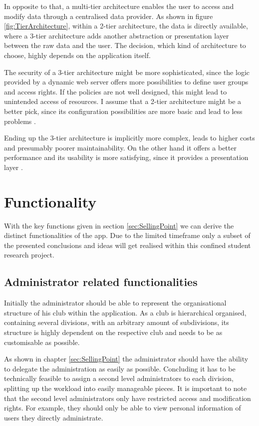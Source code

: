 In opposite to that, a multi-tier architecture enables the user to access and modify data through a centralised data provider. As shown in figure \vref{fig:TierArchitecture}, within a 2-tier architecture, the data is directly available, where a 3-tier architecture adds another abstraction or presentation layer between the raw data and the user. The decision, which kind of architecture to choose, highly depends on the application itself. 

The security of a 3-tier architecture might be more sophisticated, since the logic provided by a dynamic web server offers more possibilities to define user groups and access rights. If the policies are not well designed, this might lead to unintended access of resources. I assume that a 2-tier architecture might be a better pick, since its configuration possibilities are more basic and lead to less problems \cite{Wright:2015aa}.

Ending up the 3-tier architecture is implicitly more complex, leads to higher costs and presumably poorer maintainability. On the other hand it offers a better performance and its usability is more satisfying, since it provides a presentation layer \cite{Wright:2015aa}.

\section{Functionality} %
\label{sec:Functionality}

With the key functions given in section \vref{sec:SellingPoint} we can derive the distinct functionalities of the app. Due to the limited timeframe only a subset of the presented conclusions and ideas will get realised within this confined student research project.

\subsection{Administrator related functionalities}

Initially the administrator should be able to represent the organisational structure of his club within the application. As a club is hierarchical organised, containing several divisions, with an arbitrary amount of subdivisions, its structure is highly dependent on the respective club and needs to be as customisable as possible. 

As shown in chapter \vref{sec:SellingPoint} the administrator should have the ability to delegate the administration as easily as possible. Concluding it has to be technically feasible to assign a second level administrators to each division, splitting up the workload into easily manageable pieces. It is important to note that the second level administrators only have restricted access and modification rights. For example, they should only be able to view personal information of users they directly administrate.

